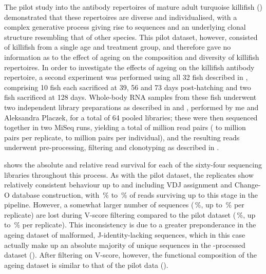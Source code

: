 The pilot study into the antibody repertoires of mature adult turquoise killifish () demonstrated that these repertoires are diverse and individualised, with a complex generative process giving rise to \naive sequences and an underlying clonal structure resembling that of other species. This pilot dataset, however, consisted of killifish from a single age and treatment group, and therefore gave no information as to the effect of ageing on the composition and diversity of killifish repertoires. In order to investigate the effects of ageing on the killifish antibody repertoire, a second \igseq experiment was performed using all 32 fish described in  , comprising 10 fish each sacrificed at 39, 56 and 73 days post-hatching and two fish sacrificed at 128 days. Whole-body RNA samples from these fish underwent two independent library preparations as described in  and , performed by me and Aleksandra Placzek, for a total of 64 pooled libraries; these were then sequenced together in two MiSeq runs, yielding a total of  million read pairs ( to  million pairs per replicate,  to  million pairs per individual), and the resulting reads underwent pre-processing, filtering and clonotyping as described in .

 shows the absolute and relative read survival for each of the sixty-four sequencing libraries throughout this process. As with the pilot dataset, the replicates show relatively consistent behaviour up to and including VDJ assignment and Change-O database construction, with \,\% to \,\% of reads surviving up to this stage in the pipeline. However, a somewhat larger number of sequences (\,\%, up to \,\% per replicate) are lost during V-score filtering compared to the pilot dataset (\,\%, up to \,\% per replicate). This inconsistency is due to a greater preponderance in the ageing dataset of malformed, J-identity-lacking sequences, which in this case actually make up an absolute majority of unique sequences in the -processed dataset (). After filtering on V-score, however, the functional composition of the ageing dataset is similar to that of the pilot data ().

